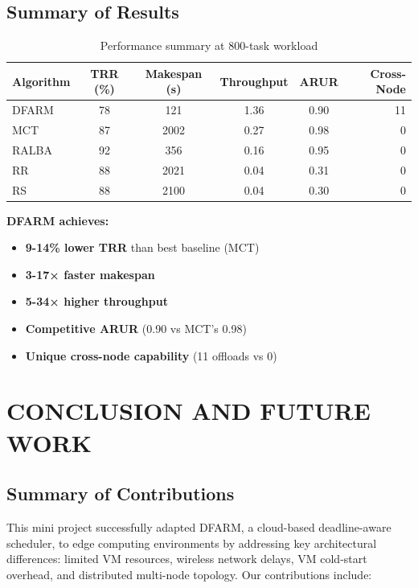 \documentclass[12pt]{report}
\begin{document}
\section{Summary of Results}

\begin{table}[H]
\centering
\caption{Performance summary at 800-task workload}
\label{tab:summary}
\begin{tabular}{lccccr}
\toprule
\textbf{Algorithm} & \textbf{TRR (\%)} & \textbf{Makespan (s)} & \textbf{Throughput} & \textbf{ARUR} & \textbf{Cross-Node} \\
\midrule
DFARM & 78 & 121 & 1.36 & 0.90 & 11 \\
MCT & 87 & 2002 & 0.27 & 0.98 & 0 \\
RALBA & 92 & 356 & 0.16 & 0.95 & 0 \\
RR & 88 & 2021 & 0.04 & 0.31 & 0 \\
RS & 88 & 2100 & 0.04 & 0.30 & 0 \\
\bottomrule
\end{tabular}
\end{table}

\textbf{DFARM achieves:}
\begin{itemize}
    \item \textbf{9-14\% lower TRR} than best baseline (MCT)
    \item \textbf{3-17× faster makespan}
    \item \textbf{5-34× higher throughput}
    \item \textbf{Competitive ARUR} (0.90 vs MCT's 0.98)
    \item \textbf{Unique cross-node capability} (11 offloads vs 0)
\end{itemize}


\chapter{CONCLUSION AND FUTURE WORK}
\label{ch:conclusion}

\section{Summary of Contributions}

This mini project successfully adapted DFARM, a cloud-based deadline-aware scheduler, to edge computing environments by addressing key architectural differences: limited VM resources, wireless network delays, VM cold-start overhead, and distributed multi-node topology. Our contributions include:
\end{document}
